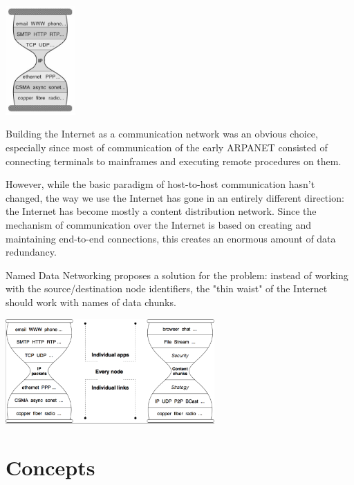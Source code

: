         \begin{center}\includegraphics[width=0.2\textwidth]{media/ndn_hourglass1.jpg}\end{center}

        Building the Internet as a communication network was an obvious choice, especially since most of communication of the early ARPANET consisted of connecting terminals to mainframes and executing remote procedures on them.

        However, while the basic paradigm of host-to-host communication hasn't changed, the way we use the Internet has gone in an entirely different direction: the Internet has become mostly a content distribution network. Since the mechanism of communication over the Internet is based on creating and maintaining end-to-end connections, this creates an enormous amount of data redundancy.

        Named Data Networking proposes a solution for the problem: instead of working with the source/destination node identifiers, the "thin waist" of the Internet should work with names of data chunks.

        \begin{center}\includegraphics[width=0.6\textwidth]{media/ndn_hourglass2.png}\end{center}

    \section{Concepts}
